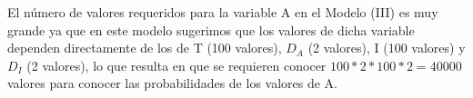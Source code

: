 \documentclass[letterpaper,11pt]{article}
\begin{document}
\begin{itemize}
        El número de valores requeridos para la variable A en el Modelo (III) es muy grande ya que en este modelo
        sugerimos que los valores de dicha variable dependen directamente de los de T (100 valores), $D_A$ (2 valores),
        I (100 valores) y
        $D_I$ (2 valores), lo que resulta en que se requieren conocer $100*2*100*2=40000$ valores para conocer las
        probabilidades de los valores de A.

\end{itemize}
\end{document}
